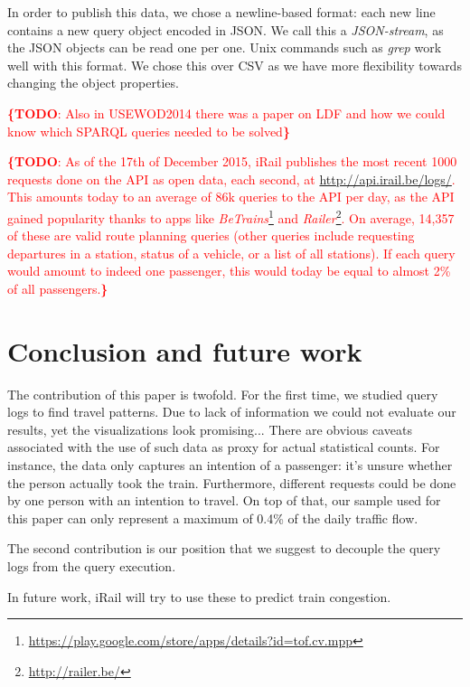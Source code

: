 \documentclass{sig-alternate}
\newcommand{\todo}[1]{\noindent\textcolor{red}{{\bf \{TODO}: #1{\bf \}}}}
\begin{document}
In order to publish this data, we chose a newline-based format: each new line contains a new query object encoded in JSON. 
We call this a \emph{JSON-stream}, as the JSON objects can be read one per one.
Unix commands such as \emph{grep} work well with this format.
We chose this over CSV as we have more flexibility towards changing the object properties.


\todo{Also in USEWOD2014 there was a paper on LDF and how we could know which SPARQL queries needed to be solved}

\todo{As of the 17th of December 2015, iRail publishes the most recent 1000 requests done on the API as open data, each second, at \url{http://api.irail.be/logs/}.
This amounts today to an average of 86k queries to the API per day, as the API gained popularity thanks to apps like \emph{BeTrains}\footnote{\url{https://play.google.com/store/apps/details?id=tof.cv.mpp}} and \emph{Railer}\footnote{\url{http://railer.be/}}.
On average, 14,357 of these are valid route planning queries (other queries include requesting departures in a station, status of a vehicle, or a list of all stations).
If each query would amount to indeed one passenger, this would today be equal to almost 2\% of all passengers.}

\section{Conclusion and future work}
\label{sec:conclusion}

The contribution of this paper is twofold.
For the first time, we studied query logs to find travel patterns.
Due to lack of information we could not evaluate our results, yet the visualizations look promising...
There are obvious caveats associated with the use of such data as proxy for actual statistical counts. 
For instance, the data only captures an intention of a passenger: it's unsure whether the person actually took the train.
Furthermore, different requests could be done by one person with an intention to travel.
On top of that, our sample used for this paper can only represent a maximum of 0.4\% of the daily traffic flow.

The second contribution is our position that we suggest to decouple the query logs from the query execution.

In future work, iRail will try to use these to predict train congestion.
\let\oldsection\section
\renewcommand{\section}[2][1]{\oldsection{#1}\vspace{-3pt}}



\end{document}
